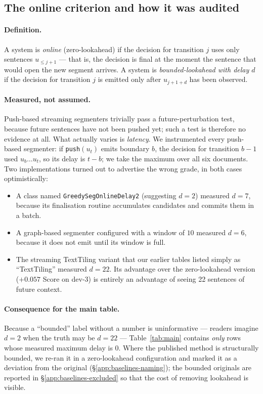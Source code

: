 \subsection{The online criterion and how it was audited}
\label{app:baselines-online}

\paragraph{Definition.}
A system is \emph{online} (zero-lookahead) if the decision for transition $j$
uses only sentences $u_{\le j+1}$ --- that is, the decision is final at the
moment the sentence that would open the new segment arrives. A system is
\emph{bounded-lookahead with delay $d$} if the decision for transition $j$ is
emitted only after $u_{j+1+d}$ has been observed.

\paragraph{Measured, not assumed.}
Push-based streaming segmenters trivially pass a future-perturbation test,
because future sentences have not been pushed yet; such a test is therefore no
evidence at all. What actually varies is \emph{latency}. We instrumented every
push-based segmenter: if \texttt{push}$(u_t)$ emits boundary $b$, the decision
for transition $b-1$ used $u_b \dots u_t$, so its delay is $t-b$; we take the
maximum over all six documents. Two implementations turned out to advertise the
wrong grade, in both cases optimistically:

\begin{itemize}\itemsep2pt
\item A class named \texttt{GreedySegOnlineDelay2} (suggesting $d{=}2$) measured
      $d{=}7$, because its finalisation routine accumulates candidates and
      commits them in a batch.
\item A graph-based segmenter configured with a window of $10$ measured $d{=}6$,
      because it does not emit until its window is full.
\item The streaming TextTiling variant that our earlier tables listed simply as
      ``TextTiling'' measured $d{=}22$. Its advantage over the zero-lookahead
      version ($+0.057$ Score on dev-3) is entirely an advantage of seeing 22
      sentences of future context.
\end{itemize}

\paragraph{Consequence for the main table.}
Because a ``bounded'' label without a number is uninformative --- readers
imagine $d{=}2$ when the truth may be $d{=}22$ --- Table~\ref{tab:main} contains
\emph{only} rows whose measured maximum delay is $0$. Where the published method
is structurally bounded, we re-ran it in a zero-lookahead configuration and
marked it as a deviation from the original (\S\ref{app:baselines-naming}); the
bounded originals are reported in \S\ref{app:baselines-excluded} so that the
cost of removing lookahead is visible.

